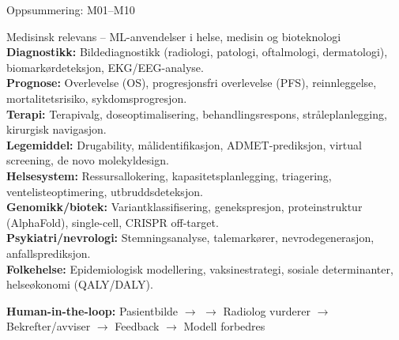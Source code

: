\documentclass[aspectratio=169, 10pt]{beamer}
\begin{document}
\begin{frame}{Oppsummering: M01--M10}
    \vspace{0mm}
    \begin{block}{\scriptsize Medisinsk relevans -- ML-anvendelser i helse, medisin og bioteknologi}
        \scriptsize
        \textbf{Diagnostikk:} Bildediagnostikk (radiologi, patologi, oftalmologi, dermatologi), biomarkørdeteksjon, EKG/EEG-analyse.\\
        \textbf{Prognose:} Overlevelse (OS), progresjonsfri overlevelse (PFS), reinnleggelse, mortalitetsrisiko, sykdomsprogresjon.\\
        \textbf{Terapi:} Terapivalg, doseoptimalisering, behandlingsrespons, stråleplanlegging, kirurgisk navigasjon.\\
        \textbf{Legemiddel:} Drugability, målidentifikasjon, ADMET-prediksjon, virtual screening, de novo molekyldesign.\\
        \textbf{Helsesystem:} Ressursallokering, kapasitetsplanlegging, triagering, ventelisteoptimering, utbruddsdeteksjon.\\
        \textbf{Genomikk/biotek:} Variantklassifisering, genekspresjon, proteinstruktur (AlphaFold), single-cell, CRISPR off-target.\\
        \textbf{Psykiatri/nevrologi:} Stemningsanalyse, talemarkører, nevrodegenerasjon, anfallsprediksjon.\\
        \textbf{Folkehelse:} Epidemiologisk modellering, vaksinestrategi, sosiale determinanter, helseøkonomi (QALY/DALY).
    \end{block}
    
    \vspace{-1mm}
    \begin{center}
    \tiny\textbf{Human-in-the-loop:} Pasientbilde $\rightarrow$  $\rightarrow$ Radiolog vurderer $\rightarrow$ Bekrefter/avviser $\rightarrow$ Feedback $\rightarrow$ Modell forbedres
    \end{center}

\end{frame}
\end{document}
